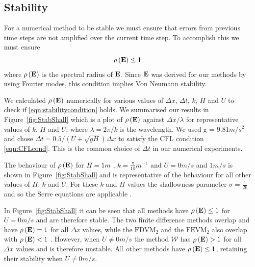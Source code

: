 \subsection{Stability}
For a numerical method to be stable we must ensure that errors from previous time steps are not amplified over the current time step. To accomplish this we must ensure 
\begin{equation}
\rho\left(\mathbf{E} \right) \le 1
\label{eqn:stabilitycondition}
\end{equation}
where $\rho\left(\mathbf{E} \right)$ is the spectral radius of $\mathbf{E}$. Since $\mathbf{E}$ was derived for our methods by using Fourier modes, this condition implies Von Neumann stability. 

We calculated $\rho\left(\mathbf{E} \right)$ numerically for various values of $\Delta x$, $\Delta t$, $k$, $H$ and $U$ to check if \eqref{eqn:stabilitycondition} holds. We summarised our results in Figure~\ref{fig:StabShall} which is a plot of $\rho\left(\mathbf{E}\right)$ against $\Delta x / \lambda$ for representative values of $k$, $H$ and $U$; where $\lambda = 2 \pi / k$ is the wavelength. We used g = $9.81m/s^2$ and chose $\Delta t = 0.5 / \left(U + \sqrt{gH}\right) \Delta x$ to satisfy the CFL condition \eqref{eqn:CFLcond}. This is the common choice of $\Delta t$ in our numerical experiments.

The behaviour of $\rho\left(\mathbf{E}\right)$ for $H=1 m$ , $k = \frac{\pi}{10} m^{-1}$ and $U = 0 m/s$ and $1 m/s$ is shown in Figure~\ref{fig:StabShall} and is representative of the behaviour for all other values of $H$, $k$ and $U$. For these $k$ and $H$ values the shallowness parameter $\sigma = \frac{1}{20}$ and so the Serre equations are applicable \cite{Barthelemy-2004-315}. 

In Figure~\ref{fig:StabShall} it can be seen that all methods have $\rho\left(\mathbf{E} \right) \le 1$ for $U=0m/s$ and are therefore stable. The two finite difference methods overlap and have $\rho\left(\mathbf{E} \right) = 1$ for all $\Delta x$ values, while the $\text{FDVM}_2$ and the $\text{FEVM}_2$ also overlap with $\rho\left(\mathbf{E} \right) < 1$ . However, when $U \neq 0m/s$ the method $\mathcal{W}$ has $\rho\left(\mathbf{E} \right) > 1$ for all $\Delta x$ values and is therefore unstable. All other methods have $\rho\left(\mathbf{E} \right) \le 1$, retaining their stability when $U \neq 0m/s$.

